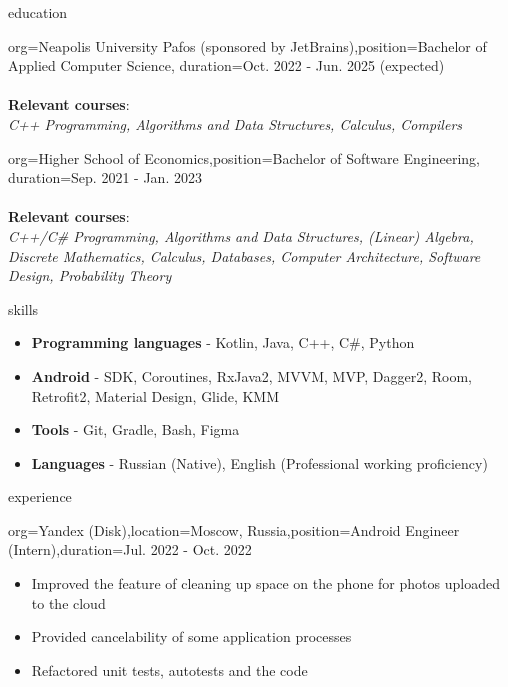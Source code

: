 \documentclass{resume}
\begin{document}
\makeheader

\begin{ResumeSection}{education}
    \begin{ResumeSubsection}{org={Neapolis University Pafos (sponsored by JetBrains)},position={Bachelor of Applied Computer Science}, duration={Oct. 2022 - Jun. 2025 (expected)}} \\ \\
    \textbf{Relevant courses}: \\
    \textit{C++ Programming, Algorithms and Data Structures, Calculus, Compilers} \\ 
    \end{ResumeSubsection}
    \begin{ResumeSubsection}{org={Higher School of Economics},position={Bachelor of Software Engineering}, duration={Sep. 2021 - Jan. 2023}} \\ \\
    \textbf{Relevant courses}: \\
    \textit{C++/C\# Programming, Algorithms and Data Structures, (Linear) Algebra, Discrete Mathematics, Calculus, Databases, Computer Architecture, Software Design, Probability Theory}
    \end{ResumeSubsection}
\end{ResumeSection}

\begin{ResumeSection}{skills}
    \newcommand{\skill}[2]{\textbf{#1} - #2}
        \begin{itemize}
            \item \skill{Programming languages}{Kotlin, Java, C++, C\#, Python}
            \item \skill{Android}{SDK, Coroutines, RxJava2, MVVM, MVP, Dagger2, Room, Retrofit2, Material Design, Glide, KMM}
            \item \skill{Tools}{Git, Gradle, Bash, Figma}
            \item \skill{Languages}{Russian (Native), English (Professional working proficiency)}
        \end{itemize}
\end{ResumeSection}

\begin{ResumeSection}{experience}
    \begin{ResumeSubsection}{org=Yandex (Disk),location={Moscow, Russia},position={Android Engineer (Intern)},duration=Jul. 2022 - Oct. 2022} 
        \begin{itemize}
            \item Improved the feature of cleaning up space on the phone for photos uploaded to the cloud
            \item Provided cancelability of some application processes
            \item Refactored unit tests, autotests and the code
        \end{itemize}
    \end{ResumeSubsection}
\end{ResumeSection}
\end{document}
